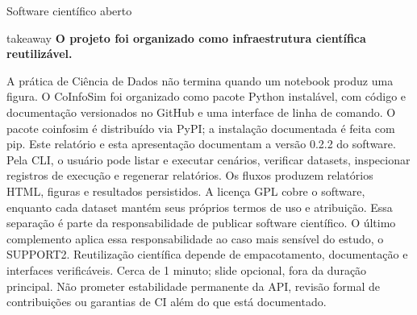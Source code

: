 \begin{frame}{Software científico aberto}
  \vspace{.09cm}
  \begin{beamercolorbox}[wd=\linewidth,sep=.12cm,rounded=true]{takeaway}
    \centering\sffamily\bfseries\fontsize{10.2}{12.1}\selectfont
    O projeto foi organizado como infraestrutura científica reutilizável.
  \end{beamercolorbox}

  \speakernotes
    {A prática de Ciência de Dados não termina quando um notebook produz uma figura. O CoInfoSim foi organizado como pacote Python instalável, com código e documentação versionados no GitHub e uma interface de linha de comando. O pacote coinfosim é distribuído via PyPI; a instalação documentada é feita com pip. Este relatório e esta apresentação documentam a versão 0.2.2 do software. Pela CLI, o usuário pode listar e executar cenários, verificar datasets, inspecionar registros de execução e regenerar relatórios. Os fluxos produzem relatórios HTML, figuras e resultados persistidos. A licença GPL cobre o software, enquanto cada dataset mantém seus próprios termos de uso e atribuição. Essa separação é parte da responsabilidade de publicar software científico.}
    {O último complemento aplica essa responsabilidade ao caso mais sensível do estudo, o SUPPORT2.}
    {Reutilização científica depende de empacotamento, documentação e interfaces verificáveis.}
    {Cerca de 1 minuto; slide opcional, fora da duração principal.}
    {Não prometer estabilidade permanente da API, revisão formal de contribuições ou garantias de CI além do que está documentado.}
\end{frame}

